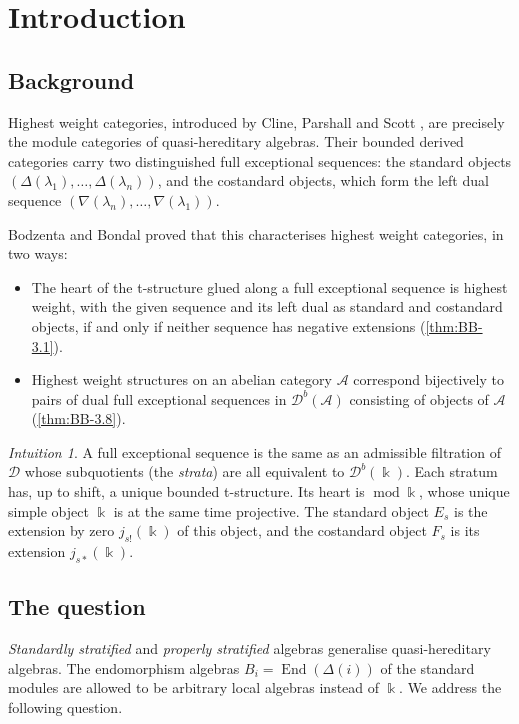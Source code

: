 \documentclass[11pt,reqno]{amsart}
\theoremstyle{plain}
\theoremstyle{definition}
\theoremstyle{remark}
\newtheorem*{intuition}{Intuition}
\newcommand{\kk}{\Bbbk}
\DeclareMathOperator{\End}{End}
\newcommand{\modd}{\operatorname{mod}}
\newcommand{\Db}{\mathcal{D}^b}
\newcommand{\cD}{\mathcal{D}}
\newcommand{\cA}{\mathcal{A}}
\begin{document}
\section{Introduction}

\subsection{Background}
Highest weight categories, introduced by Cline, Parshall and Scott \cite{CPS88}, are precisely the module categories of quasi-hereditary algebras. Their bounded derived categories carry two distinguished full exceptional sequences: the standard objects $(\Delta(\lambda_1),\dots,\Delta(\lambda_n))$, and the costandard objects, which form the left dual sequence $(\nabla(\lambda_n),\dots,\nabla(\lambda_1))$.

Bodzenta and Bondal \cite{BB26} proved that this characterises highest weight categories, in two ways:
\begin{itemize}
\item The heart of the t-structure glued along a full exceptional sequence is highest weight, with the given sequence and its left dual as standard and costandard objects, if and only if neither sequence has negative extensions (\cref{thm:BB-3.1}).
\item Highest weight structures on an abelian category $\cA$ correspond bijectively to pairs of dual full exceptional sequences in $\Db(\cA)$ consisting of objects of $\cA$ (\cref{thm:BB-3.8}).
\end{itemize}

\begin{intuition}
A full exceptional sequence is the same as an admissible filtration of $\cD$ whose subquotients (the \emph{strata}) are all equivalent to $\Db(\kk)$. Each stratum has, up to shift, a unique bounded t-structure. Its heart is $\modd\kk$, whose unique simple object $\kk$ is at the same time projective. The standard object $E_s$ is the extension by zero $j_{s!}(\kk)$ of this object, and the costandard object $F_s$ is its extension $j_{s*}(\kk)$.
\end{intuition}

\subsection{The question}
\emph{Standardly stratified} and \emph{properly stratified} algebras \cite{CPS96,Dla96,AHLU00} generalise quasi-hereditary algebras. The endomorphism algebras $B_i=\End(\Delta(i))$ of the standard modules are allowed to be arbitrary local algebras instead of $\kk$. We address the following question.
\end{document}
